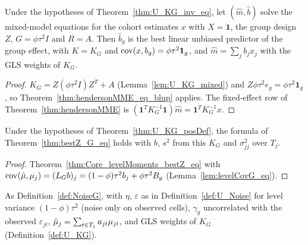 \begin{theorem}\label{thm:U_groupEffect_blup}
  \leanok
  Under the hypotheses of Theorem~\ref{thm:U_KG_inv_eq}, let $(\hat m, \hat b)$ solve the
  mixed-model equations for the cohort estimates $x$ with $X = \mathbf 1$, the group design
  $Z$, $G = \phi\tau^2 I$ and $R = A$. Then $\hat b_g$ is the best linear unbiased predictor
  of the group effect, with $K = K_G$ and $\operatorname{cov}(x, b_g) = \phi\tau^2\mathbf 1_g$, and
  $\hat m = \sum_j b_j x_j$ with the GLS weights of $K_G$.
\end{theorem}
\begin{proof}
  \leanok
  $K_G = Z(\phi\tau^2 I)Z^T + A$ (Lemma~\ref{lem:U_KG_mixed}) and $Z\phi\tau^2 e_g = \phi\tau^2\mathbf 1_g$,
  so Theorem~\ref{thm:hendersonMME_eq_blup} applies. The fixed-effect row of
  Theorem~\ref{thm:hendersonMME} is $(\mathbf 1^TK_G^{-1}\mathbf 1)\hat m = \mathbf 1^TK_G^{-1}x$.
\end{proof}

\begin{theorem}\label{thm:U_bestZ_G_eq}
  \leanok
  Under the hypotheses of Theorem~\ref{thm:U_KG_posDef}, the formula of
  Theorem~\ref{thm:bestZ_G_eq} holds with $b$, $s^2$ from this $K_G$ and
  $\sigma^2_{jj}$ over $T_j$.
\end{theorem}
\begin{proof}
  \leanok
  Theorem~\ref{thm:Core_levelMoments_bestZ_eq} with
  $\operatorname{cov}(\hat\mu,\mu_j) = (L_Gb)_j = (1-\phi)\tau^2 b_j + \phi\tau^2 B_g$
  (Lemma~\ref{lem:levelCovG_eq}).
\end{proof}

\begin{definition}\label{def:U_NoiseG}
  \leanok
  As Definition~\ref{def:NoiseG}, with $\eta$, $\varepsilon$ as in
  Definition~\ref{def:U_Noise} for level variance $(1-\phi)\tau^2$ (noise only
  on observed cells), $\gamma_g$ uncorrelated with the observed
  $\varepsilon_{jt}$, $\hat\mu_j = \sum_{t\in T_j} a_{jt}\mu_{jt}$, and GLS weights
  of $K_G$ (Definition~\ref{def:U_KG}).
\end{definition}

